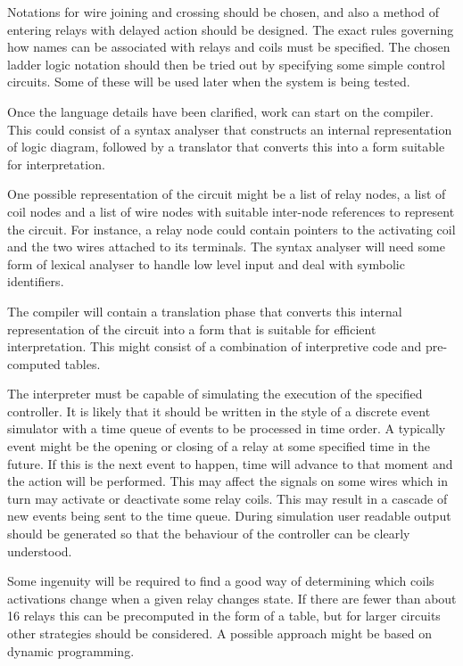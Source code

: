 \documentclass[12pt]{article}
\begin{document}
Notations for wire joining and crossing should be chosen, and also a
method of entering relays with delayed action should be designed. The
exact rules governing how names can be associated with relays and
coils must be specified. The chosen ladder logic notation should then
be tried out by specifying some simple control circuits. Some of these
will be used later when the system is being tested.

Once the language details have been clarified, work can start on the
compiler.  This could consist of a syntax analyser that constructs an
internal representation of logic diagram, followed by a translator
that converts this into a form suitable for interpretation.

One possible representation of the circuit might be a list of relay
nodes, a list of coil nodes and a list of wire nodes with suitable
inter-node references to represent the circuit. For instance, a relay
node could contain pointers to the activating coil and the two wires
attached to its terminals. The syntax analyser will need some form of
lexical analyser to handle low level input and deal with symbolic
identifiers.

The compiler will contain a translation phase that converts this
internal representation of the circuit into a form that is suitable
for efficient interpretation.  This might consist of a combination of
interpretive code and pre-computed tables.

The interpreter must be capable of simulating the execution of the
specified controller.  It is likely that it should be written in the
style of a discrete event simulator with a time queue of events to be
processed in time order. A typically event might be the opening or
closing of a relay at some specified time in the future. If this is
the next event to happen, time will advance to that moment and the
action will be performed.  This may affect the signals on some wires
which in turn may activate or deactivate some relay coils. This may
result in a cascade of new events being sent to the time queue. During
simulation user readable output should be generated so that the
behaviour of the controller can be clearly understood.

Some ingenuity will be required to find a good way of determining
which coils activations change when a given relay changes state.  If
there are fewer than about 16 relays this can be precomputed in the
form of a table, but for larger circuits other strategies should be
considered. A possible approach might be based on dynamic programming.
\end{document}
